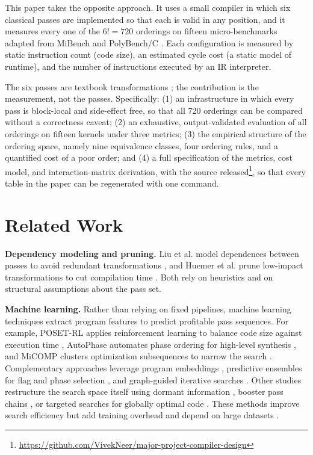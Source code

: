 \documentclass[conference,a4paper]{IEEEtran}
\begin{document}
This paper takes the opposite approach. It uses a small compiler in which six classical passes are implemented so that each is valid in any position, and it measures every one of the $6! = 720$ orderings on fifteen micro-benchmarks adapted from MiBench \cite{ref32} and PolyBench/C \cite{ref31}. Each configuration is measured by static instruction count (code size), an estimated cycle cost (a static model of runtime), and the number of instructions executed by an IR interpreter.

The six passes are textbook transformations \cite{ref18,ref21}; the contribution is the measurement, not the passes. Specifically: (1) an infrastructure in which every pass is block-local and side-effect free, so that all 720 orderings can be compared without a correctness caveat; (2) an exhaustive, output-validated evaluation of all orderings on fifteen kernels under three metrics; (3) the empirical structure of the ordering space, namely nine equivalence classes, four ordering rules, and a quantified cost of a poor order; and (4) a full specification of the metrics, cost model, and interaction-matrix derivation, with the source released\footnote{\url{https://github.com/VivekNeer/major-project-compiler-design}}, so that every table in the paper can be regenerated with one command.

\section{Related Work}

\textbf{Dependency modeling and pruning.} Liu et al. model dependences between passes to avoid redundant transformations \cite{ref1}, and Huemer et al. prune low-impact transformations to cut compilation time \cite{ref4}. Both rely on heuristics and on structural assumptions about the pass set.

\textbf{Machine learning.} Rather than relying on fixed pipelines, machine learning techniques extract program features to predict profitable pass sequences. For example, POSET-RL applies reinforcement learning to balance code size against execution time \cite{ref8}, AutoPhase automates phase ordering for high-level synthesis \cite{ref12}, and MiCOMP clusters optimization subsequences to narrow the search \cite{ref15}. Complementary approaches leverage program embeddings \cite{ref9}, predictive ensembles for flag and phase selection \cite{ref17,ref22,ref28,ref29}, and graph-guided iterative searches \cite{ref20}. Other studies restructure the search space itself using dormant information \cite{ref2,ref26}, booster pass chains \cite{ref25}, or targeted searches for globally optimal code \cite{ref3}. These methods improve search efficiency but add training overhead and depend on large datasets \cite{ref8,ref12,ref15}.
\end{document}
